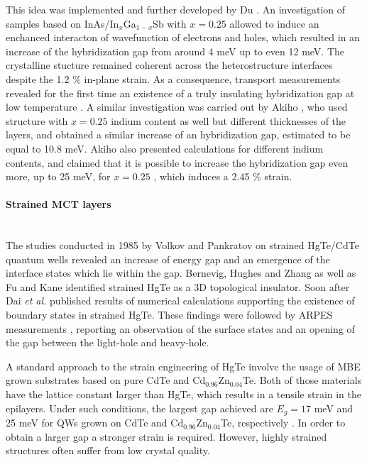 \documentclass[titlepage,a4paper]{book}
\newcommand{\wciecie}{\quad\phantom{v}}
\newcommand{\myparagraph}[1]{\paragraph{#1}\mbox{}\\}
\begin{document}
This idea was implemented and further developed by Du \cite{Du_State2}. An investigation of samples based on InAs/In$_x$Ga$_{1-x}$Sb with $x = 0.25$ allowed to induce an enchanced interacton of wavefunction of electrons and holes, which resulted in an increase of the hybridization gap from around 4 meV up to even 12 meV. The crystalline stucture remained coherent across the heterostructure interfaces despite the 1.2 \% in-plane strain. As a consequence, transport measurements revealed for the first time an existence of a truly insulating hybridization gap at low temperature \cite{Du_State2}. A similar investigation was carried out by Akiho \cite{Akiho_State}, who used structure with $x = 0.25$ indium content as well but different thicknesses of the layers, and obtained a similar increase of an hybridization gap, estimated to be equal to 10.8 meV. Akiho also presented calculations for different indium contents, and claimed that it is possible to increase the hybridization gap even more, up to 25 meV, for $x = 0.25$ \cite{Akiho_State}, which induces a 2.45 \% strain.

\myparagraph{Strained MCT layers}
\wciecie
The studies conducted in 1985 by Volkov and Pankratov \cite{Volkow_strainedMCT} on strained HgTe/CdTe quantum wells revealed an increase of energy gap and an emergence of the interface states which lie within the gap. Bernevig, Hughes and Zhang \cite{Bernevig_Topology2} as well as Fu and Kane \cite{Kane_Fu} identified strained HgTe as a 3D topological insulator. Soon after Dai \textit{et al.} \cite{Dai_MCT_layers} published results of numerical calculations supporting the existence of boundary states in strained HgTe. These findings were followed by ARPES measurements \cite{Brune_State} \cite{Crauste_StrainedMCT}, reporting an observation of the surface states and an opening of the gap between the light-hole and heavy-hole.
 
A standard approach to the strain engineering of HgTe involve the usage of MBE grown substrates based on pure CdTe and Cd$_{0.96}$Zn$_{0.04}$Te. Both of those materials have the lattice constant larger than HgTe, which results in a tensile strain in the epilayers. Under such conditions, the largest gap achieved are $E_g = 17$ meV and 25 meV for QWs grown on CdTe and Cd$_{0.96}$Zn$_{0.04}$Te, respectively \cite{Pfeuffer_State}. In order to obtain a larger gap a stronger strain is required. However, highly strained structures often suffer from low crystal quality. 
\end{document}
